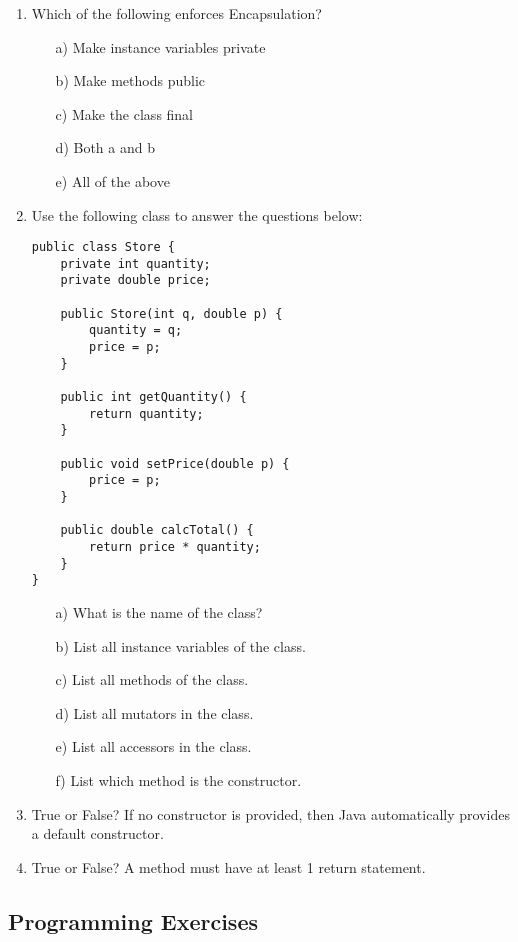 \setcounter{counter}{1}
\begin{enumerate}[label={\arabic{counter}\addtocounter{counter}{1}}.]

\item Which of the following enforces Encapsulation?
\begin{enumerate}
\item[a)]Make instance variables private
\item[b)]Make methods public
\item[c)]Make the class final
\item[d)]Both a and b
\item[e)]All of the above
\end{enumerate}

\item Use the following class to answer the questions below:
\label{question:store}
\begin{lstlisting}
public class Store {
	private int quantity;
	private double price;

	public Store(int q, double p) {
		quantity = q;
		price = p;
	}

	public int getQuantity() {
		return quantity;
	}

	public void setPrice(double p) {
		price = p;
	}

	public double calcTotal() {
		return price * quantity;
	}
}
\end{lstlisting}
\begin{enumerate}
\item[a)]What is the name of the class?
\item[b)]List all instance variables of the class.
\item[c)]List all methods of the class.
\item[d)]List all mutators in the class.
\item[e)]List all accessors in the class.
\item[f)]List which method is the constructor.
\end{enumerate}

\item True or False? If no constructor is provided, then Java automatically provides a default constructor.

\item True or False? A method must have at least 1 return statement.

\end{enumerate}

\subsection{Programming Exercises}


